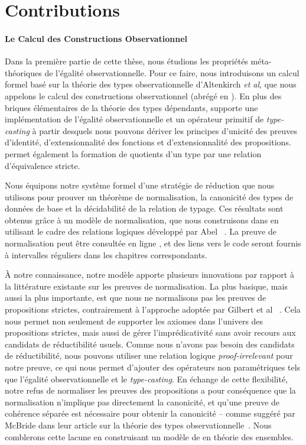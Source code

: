 \section{Contributions}

\paragraph{Le Calcul des Constructions Observationnel}
% 
Dans la première partie de cette thèse, nous étudions les propriétés méta-théoriques 
de l'égalité observationnelle. 
% 
Pour ce faire, nous introduisons un calcul formel basé sur la théorie des types 
observationnelle d'Altenkirch \textit{et al}, que nous appelons le calcul 
des constructions observationnel (abrégé en \SetoidCC). 
% 
En plus des briques élémentaires de la théorie des types dépendants, \SetoidCC
supporte une implémentation de l'égalité observationnelle et un opérateur primitif 
de \emph{type-casting} à partir desquels nous pouvons dériver les principes d'unicité 
des preuves d'identité, d'extensionnalité des fonctions et d'extensionnalité 
des propositions.
% 
\SetoidCC permet également la formation de quotients d'un type par une relation 
d'équivalence stricte.

Nous équipons notre système formel d'une stratégie de réduction que nous utilisons 
pour prouver un théorème de normalisation, la canonicité des types de données de 
base et la décidabilité de la relation de typage. 
% 
Ces résultats sont obtenus grâce à un modèle de normalisation, que nous construisons 
dans \Agda en utilisant le cadre des relations logiques développé par Abel 
\etal~. 
% 
La preuve de normalisation peut être consultée en ligne , 
et des liens vers le code seront fournis à intervalles réguliers dans les chapitres 
correspondants.

À notre connaissance, notre modèle apporte plusieurs innovations par rapport 
à la littérature existante sur les preuves de normalisation. 
% 
La plus basique, mais aussi la plus importante, est que nous ne normalisons pas 
les preuves de propositions strictes, contrairement à l'approche adoptée par 
Gilbert et al \etal~. 
% 
Cela nous permet non seulement de supporter les axiomes dans l'univers des 
propositions strictes, mais aussi de gérer l'imprédicativité sans avoir recours 
aux candidats de réductibilité usuels. 
% 
Comme nous n'avons pas besoin des candidats de réductibilité, nous pouvons 
utiliser une relation logique \emph{proof-irrelevant} pour notre preuve, ce 
qui nous permet d'ajouter des opérateurs non paramétriques tels que l'égalité 
observationnelle et le \emph{type-casting}. 
% 
En échange de cette flexibilité, notre refus de normaliser les preuves des
propositions a pour conséquence que la normalisation n'implique pas directement 
la canonicité, et qu'une preuve de cohérence séparée est nécessaire pour 
obtenir la canonicité -- comme suggéré par McBride \etal dans leur article sur 
la théorie des types observationnelle~. 
% 
Nous comblerons cette lacune en construisant un modèle de \SetoidCC en théorie 
des ensembles. 

